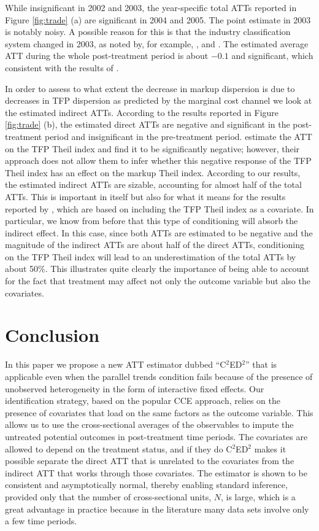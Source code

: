 \documentclass[12pt,fleqn]{article}
\begin{document}
While insignificant in 2002 and 2003, the year-specific total ATTs reported in Figure \ref{fig:trade} (a) are significant in 2004 and 2005. The point estimate in 2003 is notably noisy. A possible reason for this is that the industry classification system changed in 2003, as noted by, for example, \citet{Chen_etal_2019}, and \citet{lu2015trade}. The estimated average ATT during the whole post-treatment period is about $-0.1$ and significant, which consistent with the results of \citet{Chen_etal_2019}.

In order to assess to what extent the decrease in markup dispersion is due to decreases in TFP dispersion as predicted by the marginal cost channel we look at the estimated indirect ATTs. According to the results reported in Figure \ref{fig:trade} (b), the estimated direct ATTs are negative and significant in the post-treatment period and insignificant in the pre-treatment period. \citet{lu2015trade} estimate the ATT on the TFP Theil index and find it to be significantly negative; however, their approach does not allow them to infer whether this negative response of the TFP Theil index has an effect on the markup Theil index. According to our results, the estimated indirect ATTs are sizable, accounting for almost half of the total ATTs. This is important in itself but also for what it means for the results reported by \citet{lu2015trade}, which are based on including the TFP Theil index as a covariate. In particular, we know from before that this type of conditioning will absorb the indirect effect. In this case, since both ATTs are estimated to be negative and the magnitude of the indirect ATTs are about half of the direct ATTs, conditioning on the TFP Theil index will lead to an underestimation of the total ATTs by about 50\%. This illustrates quite clearly the importance of being able to account for the fact that treatment may affect not only the outcome variable but also the covariates.

\section{Conclusion}

In this paper we propose a new ATT estimator dubbed ``C$^2$ED$^2$'' that is applicable even when the parallel trends condition fails because of the presence of unobserved heterogeneity in the form of interactive fixed effects. Our identification strategy, based on the popular CCE approach, relies on the presence of covariates that load on the same factors as the outcome variable. This allows us to use the cross-sectional averages of the observables to impute the untreated potential outcomes in post-treatment time periods. The covariates are allowed to depend on the treatment status, and if they do C$^2$ED$^2$ makes it possible separate the direct ATT that is unrelated to the covariates from the indirect ATT that works through those covariates. The estimator is shown to be consistent and asymptotically normal, thereby enabling standard inference, provided only that the number of cross-sectional units, $N$, is large, which is a great advantage in practice because in the literature many data sets involve only a few time periods.
\end{document}
